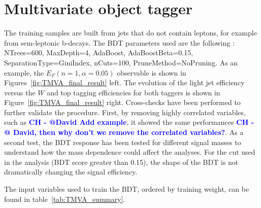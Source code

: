 \documentclass[a4paper,11pt]{article}
\newcommand{\CH}[1] {\textbf{\textcolor{blue}{CH - #1}}}
\newcommand*{\Zptt}{\ensuremath{Z^{\prime} \rightarrow \ttbar}}
\newcommand*{\rsg}{\ensuremath{G_{RS} \rightarrow W^+W^-}}
\newcommand*{\ttbar}{\ensuremath{t\bar{t}}}
\begin{document}
\section{Multivariate object tagger}
\label{sec:app:mva}
The training samples are built from jets that do not contain leptons, for example from sem-leptonic b-decays.
The BDT parameters used are the following : NTrees=600, MaxDepth=4, AdaBoost, AdaBoostBeta=0.15, SeparationType=GiniIndex, nCuts=100, PruneMethod=NoPruning.
As an example, the $E_{F}(n=1,\alpha=0.05)$ observable is shown in Figures~\ref{fig:TMVA_final_result} left.
The evolution of the light jet efficiency versus the $W$ and top tagging efficiencies for both taggers is shown in Figure~\ref{fig:TMVA_final_result} right.
Cross-checks have been performed to further validate the procedure. First, by removing highly correlated variables, such as \CH{@David Add example}, it showed the same performances \CH{@ David, then why don't we remove the correlated variables?}.
As a second test, the BDT response has been tested for different signal masses to understand how the mass dependence could affect the analyses. For the cut used in the analysis (BDT score greater than 0.15), the shape of the BDT is not dramatically changing the signal efficiency.%

The input variables used to train the BDT, ordered by training weight, can be found in table~\ref{tab:TMVA_summary}.
\end{document}
